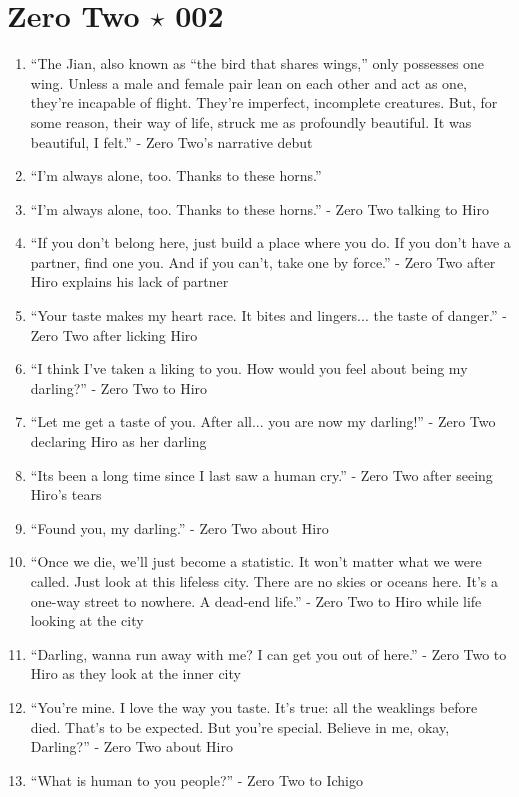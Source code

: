 \documentclass{book}
\numberwithin{equation}{section}
\begin{document}
\section{Zero Two $\star$ 002}
\begin{enumerate}
    \item ``The Jian, also known as ``the bird that shares wings,'' only possesses one wing. Unless a male and female pair lean on each other and act as one, they're incapable of flight. They're imperfect, incomplete creatures. But, for some reason, their way of life, struck me as profoundly beautiful. It was beautiful, I felt.'' - Zero Two's narrative debut
    \item ``I'm always alone, too. Thanks to these horns.''
    \item ``I'm always alone, too. Thanks to these horns.'' - Zero Two talking to Hiro
    \item ``If you don't belong here, just build a place where you do. If you don't have a partner, find one you. And if you can't, take one by force.'' - Zero Two after Hiro explains his lack of partner
    \item ``Your taste makes my heart race. It bites and lingers... the taste of danger.'' - Zero Two after licking Hiro
    \item ``I think I've taken a liking to you. How would you feel about being my darling?'' - Zero Two to Hiro
    \item ``Let me get a taste of you. After all... you are now my darling!'' - Zero Two declaring Hiro as her darling
    \item ``Its been a long time since I last saw a human cry.'' - Zero Two after seeing Hiro's tears
    \item ``Found you, my darling.'' - Zero Two about Hiro
    \item ``Once we die, we'll just become a statistic. It won't matter what we were called. Just look at this lifeless city. There are no skies or oceans here. It's a one-way street to nowhere. A dead-end life.'' - Zero Two to Hiro while life looking at the city
    \item ``Darling, wanna run away with me? I can get you out of here.'' - Zero Two to Hiro as they look at the inner city
    \item ``You're mine. I love the way you taste. It's true: all the weaklings before died. That's to be expected. But you're special. Believe in me, okay, Darling?'' - Zero Two about Hiro
    \item ``What is human to you people?'' - Zero Two to Ichigo

\end{enumerate}
\end{document}
